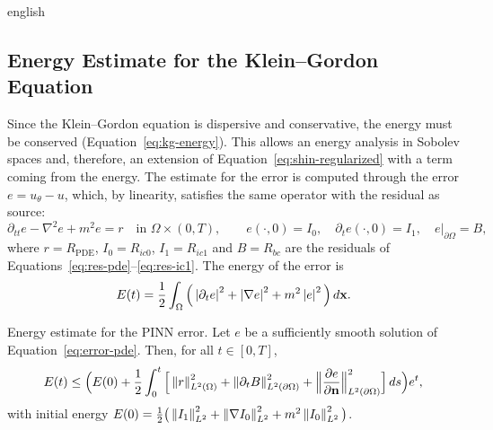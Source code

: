 \documentclass[../0000.tex]{subfiles}
\begin{document}
\begin{hyphenrules}{english}
\subsection{Energy Estimate for the Klein--Gordon Equation}\label{subsec:energy-estimate}\label{sec:energy-estimate}

Since the Klein--Gordon equation is dispersive and conservative, the energy must be conserved
(Equation~\eqref{eq:kg-energy}). This allows an energy analysis in Sobolev spaces and, therefore, an extension
of Equation~\eqref{eq:shin-regularized} with a term coming from the energy. The estimate for the error is computed
through the error $e=u_\theta-u$, which, by linearity, satisfies the same operator with the residual as
source:
\begin{equation}
  \partial_{tt}e-\nabla^2e+m^2e=r\quad\text{in }\Omega\times(0,T),\qquad
  e(\cdot,0)=I_0,\quad\partial_te(\cdot,0)=I_1,\quad e|_{\partial\Omega}=B,
  \label{eq:error-pde}
\end{equation}
where $r=R_{\mathrm{PDE}}$, $I_0=R_{ic0}$, $I_1=R_{ic1}$ and $B=R_{bc}$ are the residuals of
Equations~\eqref{eq:res-pde}--\eqref{eq:res-ic1}. The energy of the error is
\begin{equation}
  E(t)=\frac12\int_\Omega\Big(\left\lvert \partial_te \right\rvert^2+\left\lvert \nabla e \right\rvert^2+m^2\left\lvert e \right\rvert^2\Big)\,d\mathbf{x}.
  \label{eq:error-energy}
\end{equation}

\begin{teorema}{Energy estimate for the PINN error.}\label{thm:energy-estimate}
Let $e$ be a sufficiently smooth solution of Equation~\eqref{eq:error-pde}. Then, for all $t\in[0,T]$,
\begin{equation}
  E(t)\le\Big(E(0)+\frac12\int_0^t\Big[\left\lVert r \right\rVert^2_{L^2(\Omega)}+\left\lVert \partial_tB \right\rVert^2_{L^2(\partial\Omega)}
  +\Big\|\frac{\partial e}{\partial\mathbf{n}}\Big\|^2_{L^2(\partial\Omega)}\Big]\,d s\Big)e^{t},
  \label{eq:energy-bound}
\end{equation}
with initial energy
$E(0)=\frac12\big(\left\lVert I_1 \right\rVert^2_{L^2}+\left\lVert \nabla I_0 \right\rVert^2_{L^2}+m^2\left\lVert I_0 \right\rVert^2_{L^2}\big)$.
\end{teorema}


\end{hyphenrules}
\end{document}
